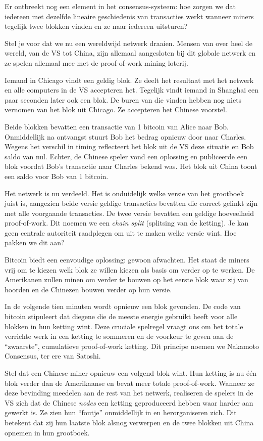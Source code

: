 \documentclass[
  letterpaper,
]{scrbook}
\begin{document}
Er ontbreekt nog een element in het consensus-systeem: hoe zorgen we dat
iedereen met dezelfde lineaire geschiedenis van transacties werkt
wanneer miners tegelijk twee blokken vinden en ze naar iedereen
uitsturen?

Stel je voor dat we nu een wereldwijd netwerk draaien. Mensen van over
heel de wereld, van de VS tot China, zijn allemaal aangesloten bij dit
globale netwerk en ze spelen allemaal mee met de proof-of-work mining
loterij.

Iemand in Chicago vindt een geldig blok. Ze deelt het resultaat met het
netwerk en alle computers in de VS accepteren het. Tegelijk vindt iemand
in Shanghai een paar seconden later ook een blok. De buren van die
vinden hebben nog niets vernomen van het blok uit Chicago. Ze accepteren
het Chinese voorstel.

Beide blokken bevatten een transactie van 1 bitcoin van Alice naar Bob.
Onmiddellijk na ontvangst stuurt Bob het bedrag opnieuw door naar
Charles. Wegens het verschil in timing reflecteert het blok uit de VS
deze situatie en Bob saldo van nul. Echter, de Chinese speler vond een
oplossing en publiceerde een blok voordat Bob's transactie naar Charles
bekend was. Het blok uit China toont een saldo voor Bob van 1 bitcoin.

Het netwerk is nu verdeeld. Het is onduidelijk welke versie van het
grootboek juist is, aangezien beide versie geldige transacties bevatten
die correct gelinkt zijn met alle voorgaande transacties. De twee versie
bevatten een geldige hoeveelheid proof-of-work. Dit noemen we een
\emph{chain split} (splitsing van de ketting). Je kan geen centrale
autoriteit raadplegen om uit te maken welke versie wint. Hoe pakken we
dit aan?

Bitcoin biedt een eenvoudige oplossing: gewoon afwachten. Het staat de
miners vrij om te kiezen welk blok ze willen kiezen als basis om verder
op te werken. De Amerikanen zullen minen om verder te bouwen op het
eerste blok waar zij van hoorden en de Chinezen bouwen verder op hun
versie.

In de volgende tien minuten wordt opnieuw een blok gevonden. De code van
bitcoin stipuleert dat diegene die de meeste energie gebruikt heeft voor
alle blokken in hun ketting wint. Deze cruciale spelregel vraagt ons om
het totale verrichte werk in een ketting te sommeren en de voorkeur te
geven aan de ``zwaarste'', cumulatieve proof-of-work ketting. Dit
principe noemen we Nakamoto Consensus, ter ere van Satoshi.

Stel dat een Chinese miner opnieuw een volgend blok wint. Hun ketting is
nu één blok verder dan de Amerikaanse en bevat meer totale
proof-of-work. Wanneer ze deze bevinding meedelen aan de rest van het
netwerk, realiseren de spelers in de VS zich dat de Chinese \emph{nodes}
een ketting geproduceerd hebben waar harder aan gewerkt is. Ze zien hun
``foutje'' onmiddellijk in en herorganiseren zich. Dit betekent dat zij
hun laatste blok alsnog verwerpen en de twee blokken uit China opnemen
in hun grootboek.
\end{document}
